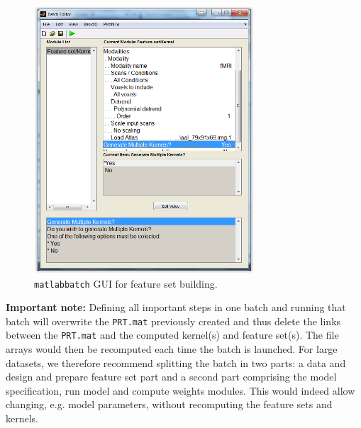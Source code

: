 \begin{figure}[!h]
  \begin{center}
      \includegraphics[height=10cm]{images/fig5_batchFS.png}
   \caption{{\tt matlabbatch} GUI for feature set building.}
    \label{fig:batchFS}
  \end{center}
\end{figure}

{\bf Important note:} Defining all important steps in one batch and running that batch will overwrite the {\tt PRT.mat} previously created and thus delete the links between the {\tt PRT.mat} and the computed kernel(s) and feature set(s). The file arrays would then be recomputed each time the batch is launched. For large datasets, we therefore recommend splitting the batch in two parts: a data and design and prepare feature set part and a second part comprising the model specification, run model and compute weights modules. This would indeed allow changing, e.g. model parameters, without recomputing the feature sets and kernels. 
